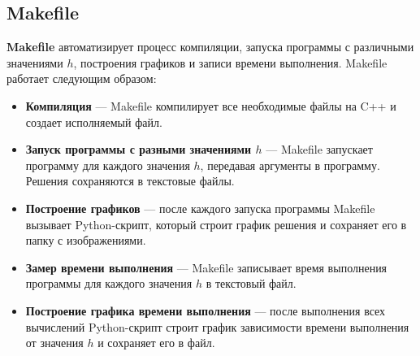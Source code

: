 \documentclass{article}
\begin{document}
\subsection{Makefile}
\textbf{Makefile} автоматизирует процесс компиляции, запуска программы с различными значениями \( h \), построения графиков и записи времени выполнения. Makefile работает следующим образом:
\begin{itemize}
    \item \textbf{Компиляция} — Makefile компилирует все необходимые файлы на C++ и создает исполняемый файл.
    \item \textbf{Запуск программы с разными значениями \( h \)} — Makefile запускает программу для каждого значения \( h \), передавая аргументы в программу. Решения сохраняются в текстовые файлы.
    \item \textbf{Построение графиков} — после каждого запуска программы Makefile вызывает Python-скрипт, который строит график решения и сохраняет его в папку с изображениями.
    \item \textbf{Замер времени выполнения} — Makefile записывает время выполнения программы для каждого значения \( h \) в текстовый файл.
    \item \textbf{Построение графика времени выполнения} — после выполнения всех вычислений Python-скрипт строит график зависимости времени выполнения от значения \( h \) и сохраняет его в файл.
\end{itemize}
\end{document}
